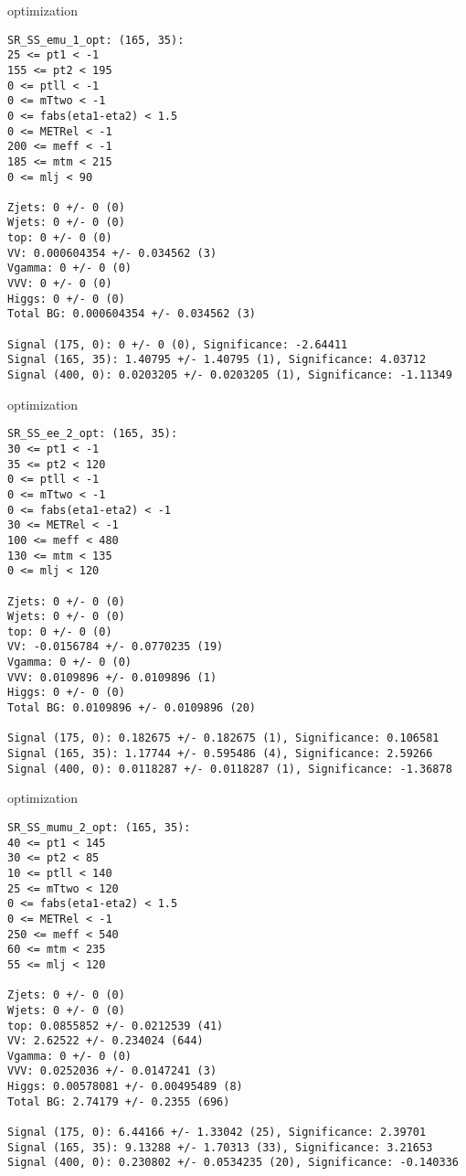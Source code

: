 \begin{frame}[fragile]{optimization}
\tiny
\begin{verbatim}
SR_SS_emu_1_opt: (165, 35):
25 <= pt1 < -1
155 <= pt2 < 195
0 <= ptll < -1
0 <= mTtwo < -1
0 <= fabs(eta1-eta2) < 1.5
0 <= METRel < -1
200 <= meff < -1
185 <= mtm < 215
0 <= mlj < 90

Zjets: 0 +/- 0 (0)
Wjets: 0 +/- 0 (0)
top: 0 +/- 0 (0)
VV: 0.000604354 +/- 0.034562 (3)
Vgamma: 0 +/- 0 (0)
VVV: 0 +/- 0 (0)
Higgs: 0 +/- 0 (0)
Total BG: 0.000604354 +/- 0.034562 (3)

Signal (175, 0): 0 +/- 0 (0), Significance: -2.64411
Signal (165, 35): 1.40795 +/- 1.40795 (1), Significance: 4.03712
Signal (400, 0): 0.0203205 +/- 0.0203205 (1), Significance: -1.11349
\end{verbatim}
\end{frame}

\begin{frame}[fragile]{optimization}
\tiny
\begin{verbatim}
SR_SS_ee_2_opt: (165, 35):
30 <= pt1 < -1
35 <= pt2 < 120
0 <= ptll < -1
0 <= mTtwo < -1
0 <= fabs(eta1-eta2) < -1
30 <= METRel < -1
100 <= meff < 480
130 <= mtm < 135
0 <= mlj < 120

Zjets: 0 +/- 0 (0)
Wjets: 0 +/- 0 (0)
top: 0 +/- 0 (0)
VV: -0.0156784 +/- 0.0770235 (19)
Vgamma: 0 +/- 0 (0)
VVV: 0.0109896 +/- 0.0109896 (1)
Higgs: 0 +/- 0 (0)
Total BG: 0.0109896 +/- 0.0109896 (20)

Signal (175, 0): 0.182675 +/- 0.182675 (1), Significance: 0.106581
Signal (165, 35): 1.17744 +/- 0.595486 (4), Significance: 2.59266
Signal (400, 0): 0.0118287 +/- 0.0118287 (1), Significance: -1.36878
\end{verbatim}
\end{frame}

\begin{frame}[fragile]{optimization}
\tiny
\begin{verbatim}
SR_SS_mumu_2_opt: (165, 35):
40 <= pt1 < 145
30 <= pt2 < 85
10 <= ptll < 140
25 <= mTtwo < 120
0 <= fabs(eta1-eta2) < 1.5
0 <= METRel < -1
250 <= meff < 540
60 <= mtm < 235
55 <= mlj < 120

Zjets: 0 +/- 0 (0)
Wjets: 0 +/- 0 (0)
top: 0.0855852 +/- 0.0212539 (41)
VV: 2.62522 +/- 0.234024 (644)
Vgamma: 0 +/- 0 (0)
VVV: 0.0252036 +/- 0.0147241 (3)
Higgs: 0.00578081 +/- 0.00495489 (8)
Total BG: 2.74179 +/- 0.2355 (696)

Signal (175, 0): 6.44166 +/- 1.33042 (25), Significance: 2.39701
Signal (165, 35): 9.13288 +/- 1.70313 (33), Significance: 3.21653
Signal (400, 0): 0.230802 +/- 0.0534235 (20), Significance: -0.140336
\end{verbatim}
\end{frame}

